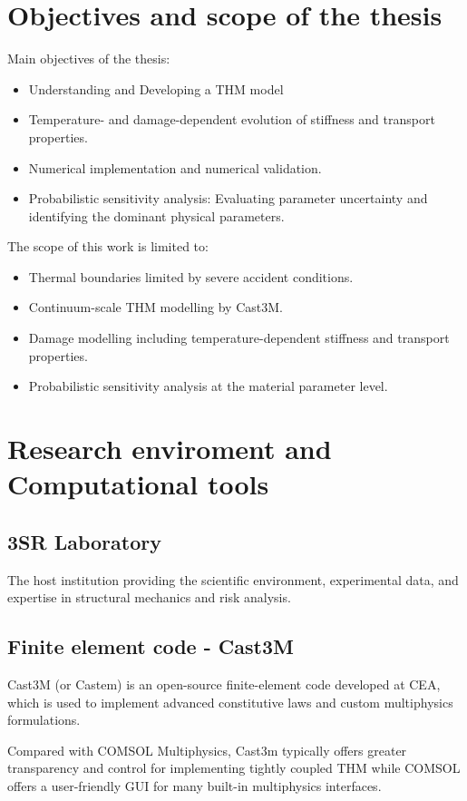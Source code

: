 \documentclass[a4paper,12pt,twoside]{report}     %
\begin{document}
\section{Objectives and scope of the thesis}

Main objectives of the thesis:
\begin{itemize}
    \item Understanding and Developing a THM model
    \item Temperature- and damage-dependent evolution of stiffness and transport properties.
    \item Numerical implementation and numerical validation.
    \item Probabilistic sensitivity analysis: Evaluating parameter uncertainty and identifying the dominant physical parameters.
\end{itemize}

The scope of this work is limited to:
\begin{itemize}
    \item Thermal boundaries limited by severe accident conditions.
    \item Continuum-scale THM modelling by Cast3M.
    \item Damage modelling including temperature-dependent stiffness and transport properties.
    \item Probabilistic sensitivity analysis at the material parameter level.
\end{itemize}

\section{Research enviroment and Computational tools}

\subsection{3SR Laboratory}
The host institution providing the scientific environment, experimental data, and expertise in structural mechanics and risk analysis.

\subsection{Finite element code - Cast3M}
Cast3M (or Castem) is an open-source finite-element code developed at CEA, which is used to implement advanced constitutive laws and custom multiphysics formulations.  

Compared with COMSOL Multiphysics, Cast3m typically offers greater transparency and control for implementing tightly coupled THM while COMSOL offers a user-friendly GUI for many built-in multiphysics interfaces.
\end{document}
